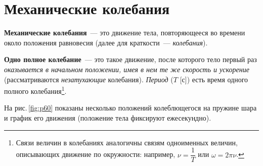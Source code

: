 \documentclass[main.tex]{subfiles}
\begin{document}

 

 

 
   

\section{Механические колебания}

\textbf{Механические колебания}~--- это движение тела, повторяющееся во времени около положения равновесия (далее для краткости~--- \emph{колебания}).

\textbf{Одно полное колебание}~--- это такое движение, после которого тело первый раз \emph{оказывается в начальном положении, имея в нем те же скорость и ускорение} (рассматриваются \emph{незатухающие} колебания). \emph{Период} ($T$ [с]) есть время одного полного колебания\footnote{Связи величин в колебаниях аналогичны связям одноименных величин, описывающих движение по окружности: например, $\nu=\dfrac{1}{T}$ или $\omega=2\pi\nu$.}. 


На рис.\,\ref{fig:p60} показаны несколько положений колеблющегося на пружине шара и график его движения (положение тела фиксируют ежесекундно).
\end{document}
